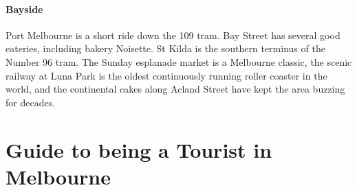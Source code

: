  

\paragraph{Bayside}

Port Melbourne is a short ride down the 109 tram. Bay Street has several good
eateries, including bakery Noisette.
St Kilda is the southern terminus of the Number 96 tram. The Sunday 
esplanade
market is a Melbourne classic, the scenic railway at Luna Park is the 
oldest
continuously running roller coaster in the world, and the continental 
cakes
along Acland Street have kept the area buzzing for decades.






\section*{Guide to being a Tourist in Melbourne}
\vspace*{-1em}

